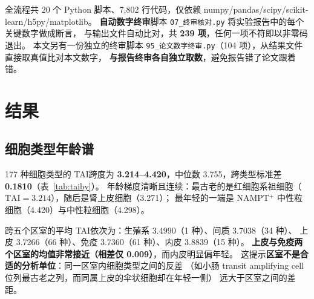 \documentclass{cjc}
\newcommand{\tai}{\textrm{TAI}}
\newcommand{\code}[1]{\texttt{\small #1}}
\begin{document}
全流程共 20 个 Python 脚本、7,802 行代码，仅依赖 numpy/pandas/scipy/scikit-learn/h5py/matplotlib。
\textbf{自动数字终审}脚本 \code{07\_终审核对.py} 将实验报告中的每个关键数字做成断言，
与输出文件自动比对，共 \textbf{239 项}，任何一项不符即以非零码退出。
本文另有一份独立的终审脚本 \code{95\_论文数字终审.py}（104 项），从结果文件直接取真值比对本文数字，
\textbf{与报告终审各自独立取数}，避免报告错了论文跟着错。

\section{结果}

\subsection{细胞类型年龄谱}

177 种细胞类型的 \tai 跨度为 \textbf{3.214--4.420}，中位数 3.755，跨类型标准差 \textbf{0.1810}（表~\ref{tab:taiby}）。
年龄梯度清晰且连续：最古老的是红细胞系祖细胞（$\tai = 3.214$），随后是肾上皮细胞（3.271）；
最年轻的一端是 NAMPT$^{+}$ 中性粒细胞（4.420）与中性粒细胞（4.298）。

跨五个区室的平均 \tai 依次为：生殖系 3.4990（1 种）、间质 3.7038（34 种）、
上皮 3.7266（66 种）、免疫 3.7360（61 种）、内皮 3.8839（15 种）。
\textbf{上皮与免疫两个区室的均值非常接近（相差仅 0.009）}，而内皮明显偏年轻。
这提示\textbf{区室不是合适的分析单位}：同一区室内细胞类型之间的反差
（如小肠 transit amplifying cell 位列最古老之列，而同属上皮的伞状细胞却在年轻一侧）
远大于区室之间的差距。
\end{document}
